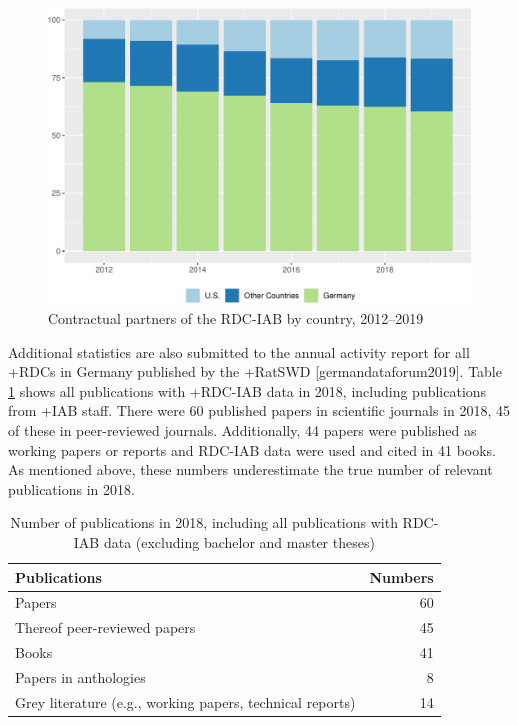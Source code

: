 \documentclass[
]{book}
\begin{document}
\begin{figure}
\centering
\includegraphics{figures/iabfig3-1.pdf}
\caption{\label{fig:iabfig3}Contractual partners of the RDC-IAB by country, 2012--2019}
\end{figure}

Additional statistics are also submitted to the annual activity report for all +RDC\textbar s in Germany published by the +RatSWD\textbar{} {[}germandataforum2019{]}. Table \ref{tab:iabtable2} shows all publications with +RDC-IAB\textbar{} data in 2018, including publications from +IAB\textbar{} staff. There were 60 published papers in scientific journals in 2018, 45 of these in peer-reviewed journals. Additionally, 44 papers were published as working papers or reports and RDC-IAB data were used and cited in 41 books. As mentioned above, these numbers underestimate the true number of relevant publications in 2018.

\begin{table}

\caption{\label{tab:iabtable2}Number of publications in 2018, including all publications with RDC-IAB data (excluding bachelor and master theses)}
\centering
\begin{tabular}[t]{lr}
\toprule
Publications & Numbers\\
\midrule
Papers & 60\\
Thereof peer-reviewed papers & 45\\
Books & 41\\
Papers in anthologies & 8\\
Grey literature (e.g., working papers, technical reports) & 14\\
\bottomrule
\end{tabular}
\end{table}
\end{document}
